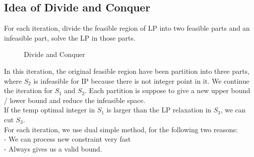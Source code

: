 				\subsection{Idea of Divide and Conquer}
					For each iteration, divide the feasible region of LP into two feasible parts and an infeasible part, solve the LP in those parts.\\
					\begin{figure}[!ht]
						\centering
						\caption{Divide and Conquer}
					\end{figure}
					In this iteration, the original feasible region have been partition into three parts, where $S_2$ is infeasible for IP because there is not integer point in it. We continue the iteration for $S_1$ and $S_2$. Each partition is suppose to give a new upper bound / lower bound and reduce the infeasible space.\\
					If the temp optimal integer in $S_1$ is larger than the LP relaxation in $S_3$, we can cut $S_3$.\\
					For each iteration, we use dual simple method, for the following two reasons:\\
					\indent - We can process new constraint very fast\\
					\indent - Always gives us a valid bound.\\

